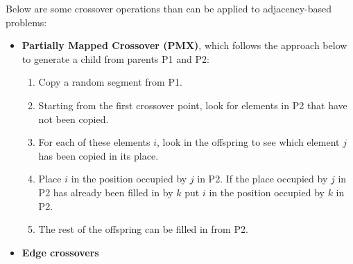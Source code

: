 \documentclass[12pt,titlepage]{article}
\begin{document}
        Below are some crossover operations than can be applied to adjacency-based problems:
        \begin{itemize}
          \item \textbf{Partially Mapped Crossover (PMX)}, which follows the approach below to generate a child from parents P1 and P2:
            \begin{enumerate}
              \item Copy a random segment from P1.
              \item Starting from the first crossover point, look for elements in P2 that have not been copied.
              \item For each of these elements $i$, look in the offspring to see which element $j$ has been copied in its place.
              \item Place $i$ in the position occupied by $j$ in P2. If the place occupied by $j$ in P2 has already been filled in by $k$ put $i$ in the position occupied by $k$ in P2.
              \item The rest of the offspring can be filled in from P2.
            \end{enumerate}
          \item \textbf{Edge crossovers}
        \end{itemize}
\end{document}
